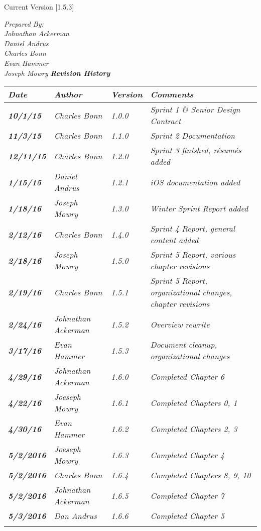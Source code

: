 


Current Version [1.5.3]
\vspace*{5mm}

{\color{SDColor5}
\noindent
\textit{Prepared By:}\\
\textit{Johnathan Ackerman}\\
\textit{Daniel Andrus}\\
\textit{Charles Bonn}\\
\textit{Evan Hammer}\\
\textit{Joseph Mowry}
}
\vfill
\noindent
{\color{SDColor3} \textit{\textbf{Revision History}}}\\
\begin{tabular}{|>{\raggedright}p{1.5cm}|>{\raggedright}p{3cm}|>{\raggedright}p{1.5cm}|>{\raggedright}p{9cm}|}
\hline
\textit{\textbf{Date}} &  \textit{\textbf{Author}} & \textit{\textbf{Version}} & \textit{\textbf{Comments}}\tabularnewline
\hline
 \textit{\textbf{10/1/15}} & \textit{Charles Bonn} & \textit{1.0.0} & \textit{Sprint 1 \& Senior Design Contract}\tabularnewline
 \hline
  \textit{\textbf{11/3/15}} & \textit{Charles Bonn} & \textit{1.1.0} & \textit{Sprint 2 Documentation}\tabularnewline
 \hline
 \textit{\textbf{12/11/15}} & \textit{Charles Bonn} & \textit{1.2.0} & \textit{Sprint 3 finished, résumés added}\tabularnewline
\hline
 \textit{\textbf{1/15/15}} & \textit{Daniel Andrus} & \textit{1.2.1} & \textit{iOS documentation added}\tabularnewline
\hline
 \textit{\textbf{1/18/16}} & \textit{Joseph Mowry} & \textit{1.3.0} & \textit{Winter Sprint Report added}\tabularnewline
\hline
 \textit{\textbf{2/12/16}} & \textit{Charles Bonn} & \textit{1.4.0} & \textit{Sprint 4 Report, general content added}\tabularnewline
\hline
 \textit{\textbf{2/18/16}} & \textit{Joseph Mowry} & \textit{1.5.0} & \textit{Sprint 5 Report, various chapter revisions}\tabularnewline
\hline
 \textit{\textbf{2/19/16}} & \textit{Charles Bonn} & \textit{1.5.1} & \textit{Sprint 5 Report, organizational changes, chapter revisions}\tabularnewline
\hline
 \textit{\textbf{2/24/16}} & \textit{Johnathan Ackerman} & \textit{1.5.2} & \textit{Overview rewrite}\tabularnewline
\hline
 \textit{\textbf{3/17/16}} & \textit{Evan Hammer} & \textit{1.5.3} & \textit{Document cleanup, organizational changes}\tabularnewline
\hline
\textit{\textbf{4/29/16}} & \textit{Johnathan Ackerman} & \textit{1.6.0} & \textit{Completed Chapter 6}\tabularnewline
\hline
\textit{\textbf{4/22/16}} & \textit{Joeseph Mowry} & \textit{1.6.1} & \textit{Completed Chapters 0, 1}\tabularnewline
\hline
\textit{\textbf{4/30/16}} & \textit{Evan Hammer} & \textit{1.6.2} & \textit{Completed Chapters 2, 3}\tabularnewline
\hline
\textit{\textbf{5/2/2016}} & \textit{Joeseph Mowry} & \textit{1.6.3} & \textit{Completed Chapter 4}\tabularnewline
\hline
\textit{\textbf{5/2/2016}} & \textit{Charles Bonn} & \textit{1.6.4} & \textit{Completed Chapters 8, 9, 10}\tabularnewline
\hline
\textit{\textbf{5/2/2016}} & \textit{Johnathan Ackerman} & \textit{1.6.5} & \textit{Completed Chapter 7}\tabularnewline
\hline
\textit{\textbf{5/3/2016}} & \textit{Dan Andrus} & \textit{1.6.6} & \textit{Completed Chapter 5}\tabularnewline
 &  &  & \tabularnewline
\hline
\end{tabular}
\vfill

